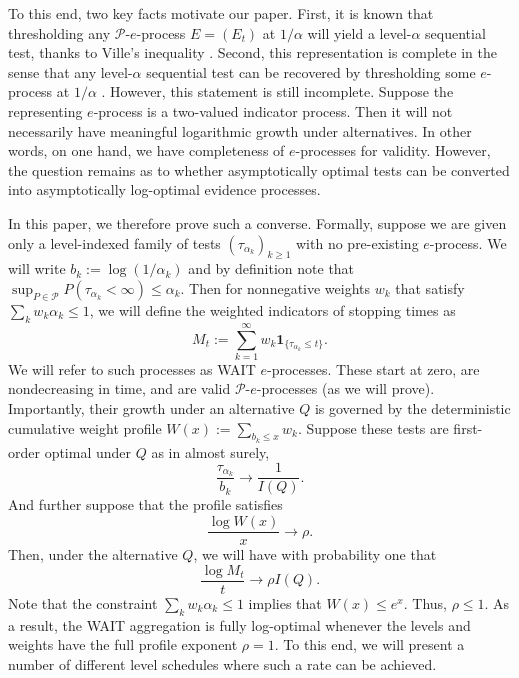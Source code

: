 \documentclass{article}
\newcommand{\PP}{\mathcal P}
\newcommand{\ind}[1]{\mathbf{1}_{\{#1\}}}
\theoremstyle{definition}
\begin{document}
To this end, two key facts motivate our paper. First, it is known that thresholding any $\PP$-$e$-process $E=(E_t)$ at $1/\alpha$ will yield a level-$\alpha$ sequential test, thanks to Ville's inequality \citep{Ville1939}. Second, this representation is complete in the sense that any level-$\alpha$ sequential test can be recovered by thresholding some $e$-process at $1/\alpha$ \citep{RamdasWang2025}. However, this statement is still incomplete. Suppose the representing $e$-process is a two-valued indicator process. Then it will not necessarily have meaningful logarithmic growth under alternatives. In other words, on one hand, we have completeness of $e$-processes for validity. However, the question remains as to whether asymptotically optimal tests can be converted into asymptotically log-optimal evidence processes. 

In this paper, we therefore prove such a converse. Formally, suppose we are given only a level-indexed family of tests $(\tau_{\alpha_k})_{k\ge 1}$ with no pre-existing $e$-process. We will write $b_k:=\log(1/\alpha_k)$ and by definition note that $\sup_{P\in\PP}P(\tau_{\alpha_k}<\infty)\le \alpha_k$. Then for nonnegative weights $w_k$ that satisfy $\sum_k w_k\alpha_k\le 1$, we will define the weighted indicators of stopping times as
\[
M_t:=\sum_{k=1}^{\infty} w_k\ind{\tau_{\alpha_k}\le t}.
\]
We will refer to such processes as WAIT $e$-processes. These start at zero, are nondecreasing in time, and are valid $\PP$-$e$-processes (as we will prove). Importantly, their growth under an alternative $Q$ is governed by the deterministic cumulative weight profile $W(x):=\sum_{b_k\le x}w_k$. Suppose these tests are first-order optimal under $Q$ as in almost surely,
\[
\frac{\tau_{\alpha_k}}{b_k}\longrightarrow \frac{1}{I(Q)}.
\]
And further suppose that the profile satisfies
\[
\frac{\log W(x)}{x}\longrightarrow \rho.
\]
Then, under the alternative $Q$, we will have with probability one that
\[
\frac{\log M_t}{t}\longrightarrow \rho I(Q).
\]
Note that the constraint $\sum_{k}w_k\alpha_k\le 1$ implies that $W(x)\le e^x$. Thus, $\rho\le 1$. As a result, the WAIT aggregation is fully log-optimal whenever the levels and weights have the full profile exponent $\rho =1$. To this end, we will present a number of different level schedules where such a rate can be achieved. 
\end{document}
